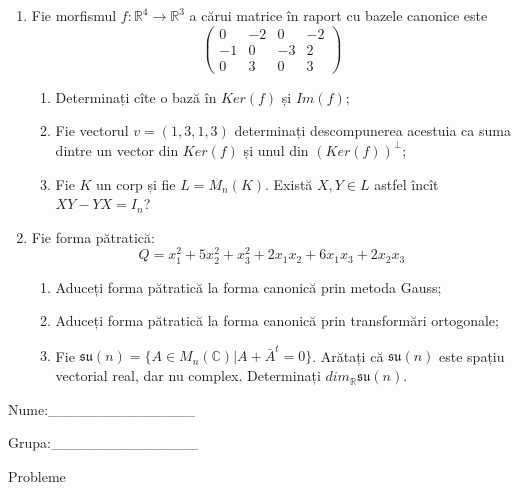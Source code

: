 \documentclass{article}
\begin{document}
\begin{enumerate}
 \item Fie morfismul $f:\mathbb{R}^4 \to \mathbb{R}^3$ a cărui matrice în raport cu bazele canonice este
$$\begin{pmatrix}
0&-2&0&-2\\
-1&0&-3&2\\
0&3&0&3
\end{pmatrix}$$

\begin{enumerate}
\item Determinați cîte o bază în $Ker(f)$ și $Im(f)$;
\item Fie vectorul $v=(1,3,1,3)$ determinați descompunerea acestuia ca suma dintre un vector din $Ker(f)$ și unul din $(Ker(f))^\perp$;
\item Fie $K$ un corp și fie $L=M_n(K)$. Există $X,Y \in L$ astfel încît $XY-YX=I_n$?  
\end{enumerate}
\item Fie forma pătratică:
$$Q= x_1^2+5x_2^2+x_3^2+2x_1x_2+6x_1x_3+2x_2x_3$$

\begin{enumerate}
\item Aduceți forma pătratică la forma canonică prin metoda Gauss;
\item Aduceți forma pătratică la forma canonică prin transformări ortogonale;
\item Fie $\mathfrak{su}(n)=\{ A \in M_n(\mathbb{C}) | A+\bar{A}^t=0\}$. Arătați că $\mathfrak{su}(n)$ este spațiu vectorial real, dar nu complex.
Determinați $dim_{\mathbb{R}}\mathfrak{su}(n)$.
\end{enumerate}
\end{enumerate}
\newpage
\begin{flushright}
Nume:\_\_\_\_\_\_\_\_\_\_\_\_\_\_
 
 
Grupa:\_\_\_\_\_\_\_\_\_\_\_\_\_\_
\end{flushright}
\begin{center}
\vspace{2cm}
{\Large Probleme}
\vspace{2cm}
\end{center}
\end{document}
